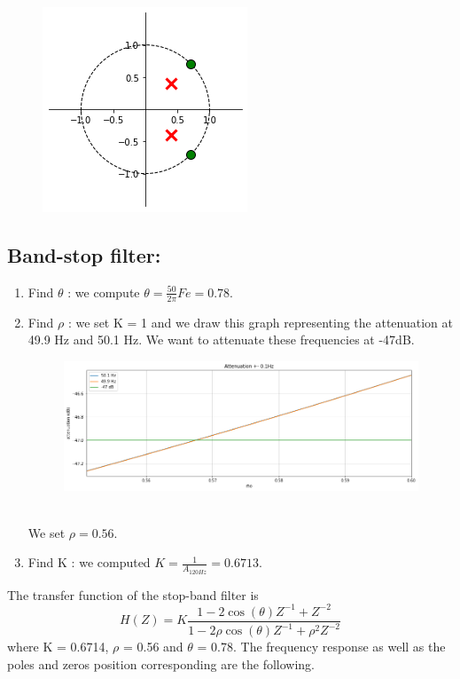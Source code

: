 \documentclass[]{article}
\begin{document}
\begin{figure}[H]
    \centering
    \includegraphics[scale=0.7]{q17.png}
\end{figure}


\subsection*{Band-stop filter:}
\begin{enumerate}
    \item Find $\theta$ : we compute $\theta = \frac{50}{2\pi}Fe = 0.78$.
    \item Find $\rho$ : we set K = 1 and we draw this graph representing the attenuation at 49.9 Hz and 50.1 Hz. 
    We want to attenuate these frequencies at -47dB.
    \begin{figure}[h]
        \centering
        \includegraphics[scale=0.5]{q13.png}
    \end{figure}\\
    We set $\rho = 0.56$.
    \item Find K : we computed $K = \frac{1}{A_{120Hz}}=0.6713$.
\end{enumerate}
The transfer function of the stop-band filter is 
$$H(Z) = K\frac{1 - 2\cos{(\theta)} Z^{-1} + Z^{-2}}{1 - 2\rho \cos{(\theta)Z^{-1} +\rho^2Z^{-2}}}$$
where K = 0.6714, $\rho$ = 0.56 and $\theta$ = 0.78. The frequency response as well as the poles and zeros position corresponding are the following.
\end{document}
